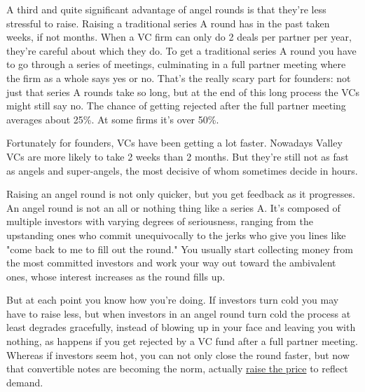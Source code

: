 A third and quite significant advantage
                    of angel rounds is that they're less stressful to raise.
                    Raising a traditional series A round has in the past taken
                    weeks, if not months. When a VC firm can only do 2 deals per
                    partner per year, they're careful about which they do. To
                    get a traditional series A round you have to go through a
                    series of meetings, culminating in a full partner meeting
                    where the firm as a whole says yes or no. That's the really
                    scary part for founders: not just that series A rounds take
                    so long, but at the end of this long process the VCs might
                    still say no. The chance of getting rejected after the full
                    partner meeting averages about 25\%. At some firms it's over
                    50\%.

Fortunately for founders, VCs have been
                    getting a lot faster. Nowadays Valley VCs are more likely to
                    take 2 weeks than 2 months. But they're still not as fast as
                    angels and super-angels, the most decisive of whom sometimes
                    decide in hours.

Raising an angel round is not
                    only quicker, but you get feedback as it progresses. An
                    angel round is not an all or nothing thing like a series A.
                    It's composed of multiple investors with varying degrees of
                    seriousness, ranging from the upstanding ones who commit
                    unequivocally to the jerks who give you lines like "come
                    back to me to fill out the round." You usually start
                    collecting money from the most committed investors and work
                    your way out toward the ambivalent ones, whose interest
                    increases as the round fills up.

But at each
                    point you know how you're doing. If investors turn cold you
                    may have to raise less, but when investors in an angel round
                    turn cold the process at least degrades gracefully, instead
                    of blowing up in your face and leaving you with nothing, as
                    happens if you get rejected by a VC fund after a full
                    partner meeting. Whereas if investors seem hot, you can not
                    only close the round faster, but now that convertible notes
                    are becoming the norm, actually
                    \href{http://www.paulgraham.com/hiresfund.html}{raise the price} to reflect
                    demand.

